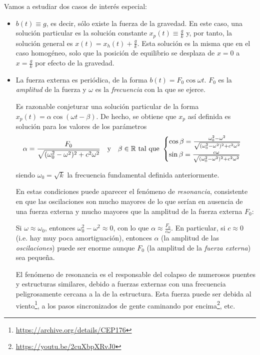 \documentclass[../ecuaciones_diferenciales.tex]{subfiles}
\begin{document}
Vamos a estudiar dos casos de interés especial:

\begin{itemize}
	\item \(b(t) \equiv g\), es decir, sólo existe la fuerza de la gravedad. En
	      este caso, una solución particular es la solución constante \(x_p(t) \equiv
	      \frac{g}{k}\) y, por tanto, la solución general es \(x(t) = x_h(t) +
	      \frac{g}{k}\). Esta solución es la misma que en el caso homogéneo, solo que
	      la posición de equilibrio se desplaza de \(x=0\) a \(x=\frac{g}{k}\) por
	      efecto de la gravedad.
	\item La fuerza externa es periódica, de la forma
	      \(b(t) = F_0 \cos \omega t\). \(F_0\) es la \emph{amplitud} de la fuerza y
	      \(\omega\) es la \emph{frecuencia} con la que se ejerce.

	      Es razonable conjeturar una solución particular de la forma \(x_p(t) =
	      \alpha \cos (\omega t - \beta)\). De hecho, se obtiene que \(x_p\) así
	      definida es solución para los valores de los parámetros
	      \[\alpha = \frac{F_0}{\sqrt{(\omega_0^2-\omega^2)^2+c^2\omega^2}} \quad
		      \text{y} \quad \beta \in \mathbb{R} \text{ tal que }
		      \begin{cases}
			      \cos \beta =
			      \frac{\omega_0^2-\omega^2}{\sqrt{(\omega_0^2-\omega^2)^2+c^2\omega^2}} \\
			      \sin \beta = \frac{c\omega}{\sqrt{(\omega_0^2-\omega^2)^2+c^2\omega^2}}
		      \end{cases}
	      \]

	      siendo \(\omega_0 = \sqrt{k}\) la frecuencia fundamental definida
	      anteriormente.

	      En estas condiciones puede aparecer el fenómeno de \emph{resonancia},
	      consistente en que las oscilaciones son mucho mayores de lo que serían en
	      ausencia de una fuerza externa y mucho mayores que la amplitud de la fuerza
	      externa \(F_0\):

	      Si \(\omega \approx \omega_0\), entonces \(\omega_0^2-\omega^2 \approx 0\),
	      con lo que \(\alpha \approx \frac{F_0}{c\omega}\). En particular, si
	      \(c \approx 0\) (i.e. hay muy poca amortiguación), entonces \(\alpha\) (la
	      amplitud de las \emph{oscilaciones}) puede ser enorme aunque \(F_0\) (la
	      amplitud de la \emph{fuerza externa}) sea pequeña.

	      El fenómeno de resonancia es el responsable del colapso de numerosos puentes
	      y estructuras similares, debido a fuerzas externas con una frecuencia
	      peligrosamente cercana a la de la estructura. Esta fuerza puede ser debida
	      al viento\footnote{\url{https://archive.org/details/CEP176}}, a los pasos
	      sincronizados de gente caminando por
	      encima\footnote{\url{https://youtu.be/2cuXbpXRvJ0}}, etc.
\end{itemize}
\end{document}

